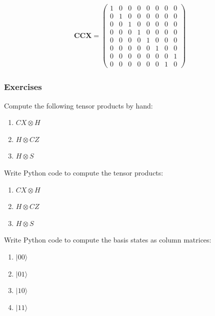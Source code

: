 \documentclass[11pt]{article}
\providecommand{\tightlist}{%
      \setlength{\itemsep}{0pt}\setlength{\parskip}{0pt}}
\begin{document}
\begin{align}
\mathbf{CCX}
= \begin{pmatrix}
1 & 0 & 0 & 0 & 0 & 0 & 0 & 0 \\
0 & 1 & 0 & 0 & 0 & 0 & 0 & 0 \\
0 & 0 & 1 & 0 & 0 & 0 & 0 & 0 \\
0 & 0 & 0 & 1 & 0 & 0 & 0 & 0 \\
0 & 0 & 0 & 0 & 1 & 0 & 0 & 0 \\
0 & 0 & 0 & 0 & 0 & 1 & 0 & 0 \\
0 & 0 & 0 & 0 & 0 & 0 & 0 & 1 \\
0 & 0 & 0 & 0 & 0 & 0 & 1 & 0 
\end{pmatrix}
\end{align}

    \hypertarget{exercises}{%
\subsubsection{Exercises}\label{exercises}}

Compute the following tensor products by hand:

\begin{enumerate}
\def\labelenumi{\arabic{enumi}.}
\tightlist
\item
  \(CX \otimes H\)
\item
  \(H \otimes CZ\)
\item
  \(H \otimes S\)
\end{enumerate}

Write Python code to compute the tensor products:

\begin{enumerate}
\def\labelenumi{\arabic{enumi}.}
\setcounter{enumi}{3}
\tightlist
\item
  \(CX \otimes H\)
\item
  \(H \otimes CZ\)
\item
  \(H \otimes S\)
\end{enumerate}

Write Python code to compute the basis states as column matrices:

\begin{enumerate}
\def\labelenumi{\arabic{enumi}.}
\setcounter{enumi}{6}
\tightlist
\item
  \(|00 \rangle\)
\item
  \(|01 \rangle\)
\item
  \(|10 \rangle\)
\item
  \(|11 \rangle\)
\end{enumerate}
\end{document}
